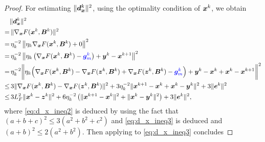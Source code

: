 \begin{proof}
    For estimating $\| \bm{d}_{\bm{x}}^{k}\|^{2}$, using the optimality condition of
    $\bm{x}^{k}$, we obtain
    {\small
    \begin{align}
             & \|\bd_{\bx}^{k}\|^{2}\notag                                                                                                                                                                                                                   \\
        =    & \,\|\nabla_{\bx}F(\bx^{k}, \bm{B}^{k}) \|^{2}\notag                                                                                                                                                                                           \\
        =    & \,\eta_{k}^{-2}\left\| \eta_{k}\nabla_{\bx}F(\bx^{k}, \bm{B}^{k}) + 0\right\|^{2}\notag                                                                                                                                                       \\
        =    & \, \eta_{k}^{-2}\left\|\eta_{k}\left( \nabla_{\bx}F(\bx^{k}, \bm{B}^{k}) - \blue{\bg_m^{k}}\right) + \bm{y}^{k}- \bx^{k+1}\right\|^{2}\notag                                                                                                           \\
        =    & \,\eta_{k}^{-2}\bigg\|\eta_{k}\Big( \nabla_{\bx}F(\bx^{k}, \bm{B}^{k}) - \nabla_{\bx}F(\bm{z}^{k}, \bm{B}^{k}) + \nabla_{\bx}F(\bm{z}^{k}, \bm{B}^{k})- \blue{\bg_m^{k}}\Big) + \bm{y}^{k}- \bx^{k}+ \bx^{k}- \bx^{k+1}\bigg\|^{2}\label{eq:d_x_ineq1} \\
        \leq & \, 3 \|\nabla_{\bx}F(\bx^{k}, \bm{B}^{k}) - \nabla_{\bx}F(\bm{z}^{k}, \bm{B}^{k})\|^{2}+ 3\eta_{k}^{-2}\|\bx^{k+1}- \bx^{k}+ \bx^{k}- \bm{y}^{k}\|^{2}+ 3 \|\be^{k}\|^{2}\label{eq:d_x_ineq2}                                                 \\
        \leq & \, 3L_{F}^{2}\|\bx^{k}- \bm{z}^{k}\|^{2}+ 6\eta_{k}^{-2}\left(\|\bx^{k+1}- \bx^{k}\|^{2}+ \|\bx^{k}- \bm{y}^{k}\|^{2}\right) + 3 \|\be^{k}\|^{2},\label{eq:d_x_ineq3}                                                                      
    \end{align}}where \eqref{eq:d_x_ineq2} is deduced by using the fact that
    $(a + b+ c)^{2}\leq 3(a^{2}+ b^{2}+c^{2})$ and \eqref{eq:d_x_ineq3} is deduced
     and $(a + b)^{2}\leq 2(a^{2}+ b^{2})$.
    Then applying  to \eqref{eq:d_x_ineq3} concludes

\end{proof}
